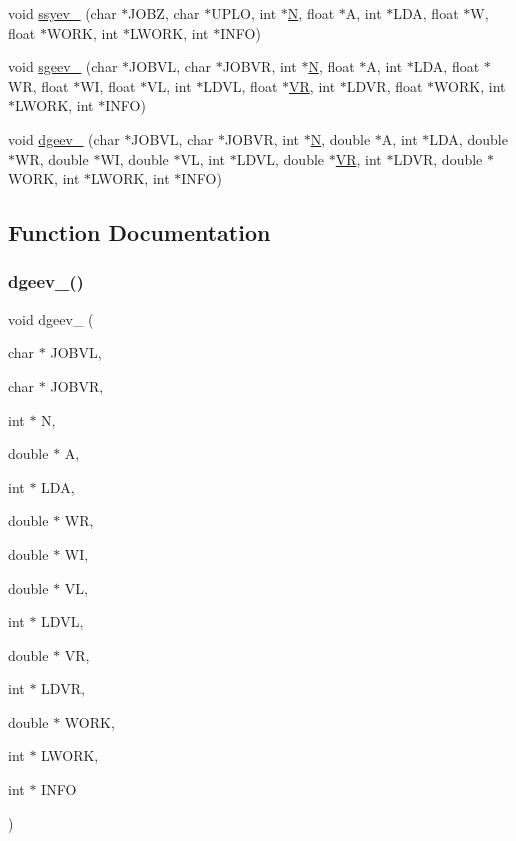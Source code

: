 \begin{DoxyCompactItemize}
\item 
void \hyperlink{a00476_ae8198e35b3f42d000420a225a16e180d}{ssyev\+\_\+} (char $\ast$J\+O\+BZ, char $\ast$U\+P\+LO, int $\ast$\hyperlink{a00473_a5b9c4563028063ee53b517cce9aa701b}{N}, float $\ast$A, int $\ast$L\+DA, float $\ast$W, float $\ast$W\+O\+RK, int $\ast$L\+W\+O\+RK, int $\ast$I\+N\+FO)
\item 
void \hyperlink{a00476_aad9901e2647c52ccb37aa880bb3be274}{sgeev\+\_\+} (char $\ast$J\+O\+B\+VL, char $\ast$J\+O\+B\+VR, int $\ast$\hyperlink{a00473_a5b9c4563028063ee53b517cce9aa701b}{N}, float $\ast$A, int $\ast$L\+DA, float $\ast$WR, float $\ast$WI, float $\ast$VL, int $\ast$L\+D\+VL, float $\ast$\hyperlink{a00245_ae35e5b9a801b8c91c5597bb6c62db08a}{VR}, int $\ast$L\+D\+VR, float $\ast$W\+O\+RK, int $\ast$L\+W\+O\+RK, int $\ast$I\+N\+FO)
\item 
void \hyperlink{a00476_a50daa3bcff917e3b0813666606e8429a}{dgeev\+\_\+} (char $\ast$J\+O\+B\+VL, char $\ast$J\+O\+B\+VR, int $\ast$\hyperlink{a00473_a5b9c4563028063ee53b517cce9aa701b}{N}, double $\ast$A, int $\ast$L\+DA, double $\ast$WR, double $\ast$WI, double $\ast$VL, int $\ast$L\+D\+VL, double $\ast$\hyperlink{a00245_ae35e5b9a801b8c91c5597bb6c62db08a}{VR}, int $\ast$L\+D\+VR, double $\ast$W\+O\+RK, int $\ast$L\+W\+O\+RK, int $\ast$I\+N\+FO)
\end{DoxyCompactItemize}


\subsection{Function Documentation}
\mbox{\label{a00476_a50daa3bcff917e3b0813666606e8429a}} 
\subsubsection{\texorpdfstring{dgeev\+\_\+()}{dgeev\_()}}
{\footnotesize\ttfamily void dgeev\+\_\+ (\begin{DoxyParamCaption}\item[{char $\ast$}]{J\+O\+B\+VL,  }\item[{char $\ast$}]{J\+O\+B\+VR,  }\item[{int $\ast$}]{N,  }\item[{double $\ast$}]{A,  }\item[{int $\ast$}]{L\+DA,  }\item[{double $\ast$}]{WR,  }\item[{double $\ast$}]{WI,  }\item[{double $\ast$}]{VL,  }\item[{int $\ast$}]{L\+D\+VL,  }\item[{double $\ast$}]{VR,  }\item[{int $\ast$}]{L\+D\+VR,  }\item[{double $\ast$}]{W\+O\+RK,  }\item[{int $\ast$}]{L\+W\+O\+RK,  }\item[{int $\ast$}]{I\+N\+FO }\end{DoxyParamCaption})}


